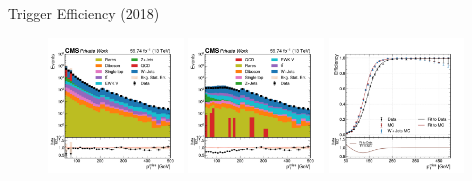 \begin{frame}[fragile]{Trigger Efficiency (2018)}
  \begin{figure}[htpb]
    \centering
    \includegraphics[width=0.32\textwidth]{fig/trigger/Misc-MET-Trigger-Eff_2018_den.pdf}
    \includegraphics[width=0.32\textwidth]{fig/trigger/Misc-MET-Trigger-Eff_2018_num.pdf}
    \includegraphics[width=0.32\textwidth]{fig/trigger/Misc-MET-Trigger-Eff_2018_eff.pdf}
  \end{figure}	
\end{frame}



